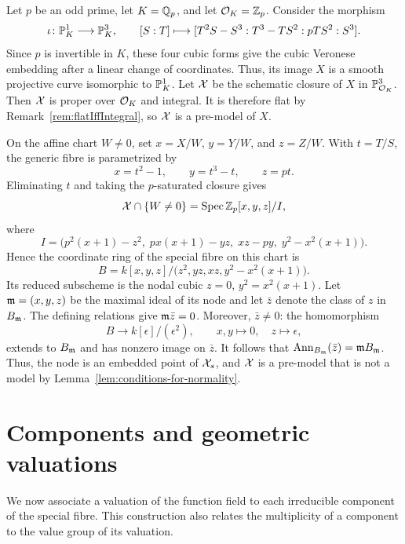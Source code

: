 \begin{example}\label{ex:premodel-with-embedded-point}
    Let $p$ be an odd prime, let $K=\mathbb Q_p$, and let $\mathcal O_K=\mathbb Z_p$.
    Consider the morphism
    \[
        \iota\colon \mathbb P^1_K \longrightarrow \mathbb P^3_K,
        \qquad
        [S:T]\longmapsto [T^2S-S^3:T^3-TS^2:pTS^2:S^3].
    \]
    Since $p$ is invertible in $K$, these four cubic forms give the cubic Veronese embedding after a linear change of coordinates.
    Thus, its image $X$ is a smooth projective curve isomorphic to $\mathbb P^1_K$.
    Let $\mathcal X$ be the schematic closure of $X$ in $\mathbb P^3_{\mathcal O_K}$.
    Then $\mathcal X$ is proper over $\mathcal O_K$ and integral.
    It is therefore flat by Remark~\ref{rem:flatIffIntegral}, so $\mathcal X$ is a pre-model of $X$.

    On the affine chart $W\neq 0$, set $x=X/W$, $y=Y/W$, and $z=Z/W$.
    With $t=T/S$, the generic fibre is parametrized by
    \[
        x=t^2-1,\qquad y=t^3-t,\qquad z=pt.
    \]
    Eliminating $t$ and taking the $p$-saturated closure gives
    \[
        \mathcal X\cap\{W\neq 0\}
        =\operatorname{Spec}{\mathbb Z_p[x,y,z]/I},
    \]
    where
    \[
        I=\bigl(p^2(x+1)-z^2,\;px(x+1)-yz,\;xz-py,\;
        y^2-x^2(x+1)\bigr).
    \]
    Hence the coordinate ring of the special fibre on this chart is
    \[
        B=k[x,y,z]/\bigl(z^2,yz,xz,y^2-x^2(x+1)\bigr).
    \]
    Its reduced subscheme is the nodal cubic $z=0$, $y^2=x^2(x+1)$.
    Let $\mathfrak m=(x,y,z)$ be the maximal ideal of its node and let $\bar z$ denote the class of $z$ in $B_{\mathfrak m}$.
    The defining relations give $\mathfrak m\bar z=0$.
    Moreover, $\bar z\neq 0$: the homomorphism
    \[
        B\longrightarrow k[\epsilon]/(\epsilon^2),
        \qquad x,y\longmapsto 0,\quad z\longmapsto\epsilon,
    \]
    extends to $B_{\mathfrak m}$ and has nonzero image on $\bar z$.
    It follows that $\operatorname{Ann}_{B_{\mathfrak m}}(\bar z)=\mathfrak m B_{\mathfrak m}$.
    Thus, the node is an embedded point of $\mathcal X_s$, and $\mathcal X$ is a pre-model that is not a model by Lemma~\ref{lem:conditions-for-normality}.
\end{example}


\section{Components and geometric valuations}\label{sec:components-and-geometric-valuations}
We now associate a valuation of the function field to each irreducible component of the special fibre. This construction also relates the multiplicity of a component to the value group of its valuation.


